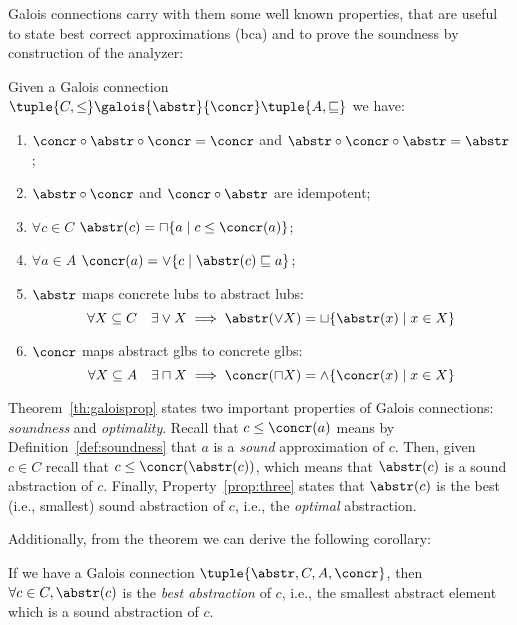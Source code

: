 Galois connections carry with them some well known properties, that
are useful to state best correct approximations (bca) and to prove the
soundness by construction of the analyzer:

\begin{theorem}\label{th:galoisprop}
  Given a Galois connection
  \(\tuple{C,\leq} \galois{\abstr}{\concr} \tuple{A, \sqsubseteq}\) we
  have:
  \begin{enumerate}
  \item \(\concr \circ \abstr \circ \concr = \concr\) and
    \(\abstr \circ \concr \circ \abstr = \abstr\);
  \item \(\abstr \circ \concr\) and \(\concr \circ \abstr\) are
    idempotent;
  \item\label{prop:three} \(\forall c \in C\)
    \(\abstr(c) = \sqcap \{a \mid c \leq \concr(a)\}\);
  \item\label{prop:four} \(\forall a \in A\)
    \(\concr(a) = \vee \{ c \mid \abstr(c) \sqsubseteq a \}\);
  \item\label{prop:five} \(\abstr\) maps concrete lubs to abstract lubs:
    \begin{equation*}
      \forall X \subseteq C \quad \exists \vee X \implies \abstr(\vee X) = \sqcup \{\abstr(x) \mid x \in X\}
    \end{equation*}
  \item \(\concr\) maps abstract glbs to concrete glbs:
    \begin{equation*}
      \forall X \subseteq A \quad \exists \sqcap X \implies \concr(\sqcap X) = \wedge \{\concr(x) \mid x \in X\}
    \end{equation*}
  \end{enumerate}
\end{theorem}

Theorem~\ref{th:galoisprop} states two important properties of Galois
connections: \emph{soundness} and \emph{optimality}. Recall that
\(c \leq \concr(a)\) means by Definition~\ref{def:soundness} that
\(a\) is a \emph{sound} approximation of \(c\). Then, given
\(c \in C\) recall that \(c \leq \concr(\abstr(c))\), which means that
\(\abstr(c)\) is a sound abstraction of \(c\). Finally,
Property~\ref{prop:three} states that \(\abstr(c)\) is the best (i.e.,
smallest) sound abstraction of \(c\), i.e., the \emph{optimal}
abstraction.

Additionally, from the theorem we can derive the
following corollary:

\begin{corollary}\label{co:bestabstr}
  If we have a Galois connection \(\tuple{\abstr, C, A, \concr}\),
  then \(\forall c \in C, \abstr(c)\) is the \emph{best abstraction}
  of \(c\), i.e., the smallest abstract element which is a sound
  abstraction of \(c\).
\end{corollary}

